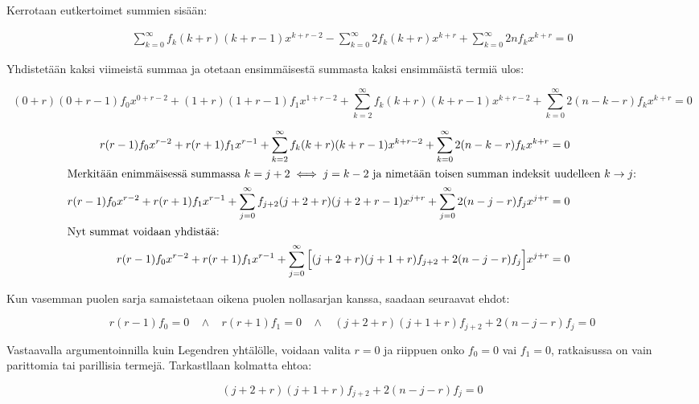 \documentclass[../johdoksia.tex]{subfiles}
\begin{document}
	\noindent Kerrotaan eutkertoimet summien sisään:
	
	\begin{align*}
		\sum_{k = 0}^{\infty}f_k(k + r)(k + r - 1)x^{k + r - 2} - \sum_{k = 0}^{\infty}2f_k(k + r)x^{k + r} + \sum_{k = 0}^{\infty}2nf_kx^{k + r} = 0
	\end{align*}

	\noindent Yhdistetään kaksi viimeistä summaa ja otetaan ensimmäisestä summasta kaksi ensimmäistä termiä ulos:

	\begin{equation*}
		(0 + r)(0 + r - 1)f_0x^{0 + r - 2} + (1 + r)(1 + r - 1)f_1x^{1 + r - 2} + \sum_{k = 2}^{\infty}f_k(k + r)(k + r - 1)x^{k + r - 2} + \sum_{k = 0}^{\infty}2(n - k - r)f_kx^{k + r} = 0
	\end{equation*}

	\begin{align*}
		r(r - 1)f_0x^{r - 2}+ r(r + 1)f_1x^{r - 1} + \sum_{k = 2}^{\infty}f_k(k + r)(k + r - 1)x^{k + r - 2} + \sum_{k = 0}^{\infty}2(n-k-r)f_kx^{k + r} &= 0 \\
		\intertext{Merkitään enimmäisessä summassa $k = j + 2 \iff j = k - 2$ ja nimetään toisen summan indeksit uudelleen $k\to j$:}
		r(r - 1)f_0x^{r - 2}+ r(r + 1)f_1x^{r - 1} + \sum_{j = 0}^{\infty}f_{j + 2}(j + 2 + r)(j + 2 + r - 1)x^{j + r} + \sum_{j = 0}^{\infty}2(n-j-r)f_jx^{j + r} &= 0 \\
		\intertext{Nyt summat voidaan yhdistää:}
		r(r - 1)f_0x^{r - 2}+ r(r + 1)f_1x^{r - 1} + \sum_{j = 0}^{\infty}\Big[(j + 2 + r)(j + 1 + r)f_{j + 2} + 2(n - j - r)f_j\Big]x^{j + r} &= 0 \\
	\end{align*}

	\noindent Kun vasemman puolen sarja samaistetaan oikena puolen nollasarjan kanssa, saadaan seuraavat ehdot:
	
	\begin{equation*}
		r(r - 1)f_0 = 0 \ \ \ \ \land \ \ \ \ r(r + 1)f_1 = 0 \ \ \ \ \land \ \ \ \ (j + 2 + r)(j + 1 + r)f_{j + 2} + 2(n - j - r)f_j = 0
	\end{equation*}

	Vastaavalla argumentoinnilla kuin Legendren yhtälölle, voidaan valita $r = 0$ ja riippuen onko $f_0 = 0$ vai $f_1 = 0$, ratkaisussa on vain parittomia tai parillisia termejä. Tarkastllaan kolmatta ehtoa:
	
	\begin{equation*}
		(j + 2 + r)(j + 1 + r)f_{j + 2} + 2(n - j - r)f_j = 0
	\end{equation*}
\end{document}
